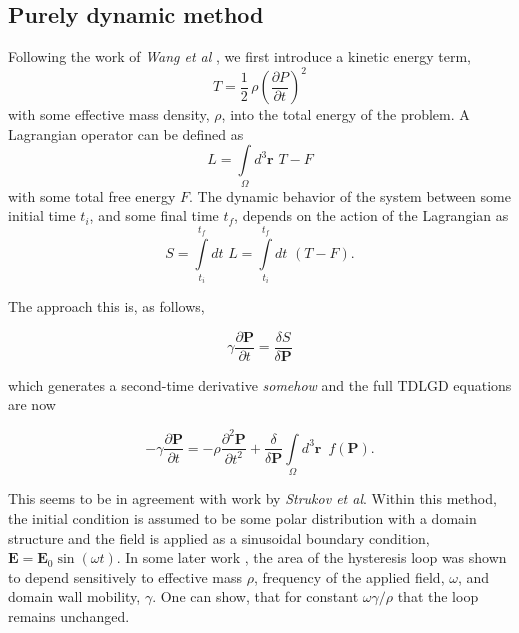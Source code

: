 \documentclass[16pt]{article} %
\begin{document}
\subsection{Purely dynamic method}
%

%
Following the work of \emph{Wang et al} \cite{Wang2003}, we first introduce a kinetic energy term,
%
$$T =  \frac{1}{2} \,\rho \left(\frac{\partial P}{\partial t} \right)^2 $$
%
with some effective mass density, $\rho$, into the total energy of the problem. A Lagrangian operator can be defined as
%
$$L = \int\limits_\Omega d^3 \textbf{r} \,\, T - F$$
%
with some total free energy $F$.
%
The dynamic behavior of the system between some initial time $t_i$, and some final time $t_f$, depends on the action of the Lagrangian as
%
$$S = \int\limits_{t_i}^{t_f} dt \,\, L  =  \int\limits_{t_i}^{t_f} dt \,\, \left(T - F \right). $$

The approach this is, as follows,

$$\gamma \frac{\partial \textbf{P}}{\partial t} =  \frac{\delta S}{\delta \textbf{P}}$$

which generates a second-time derivative \emph{somehow} and the full TDLGD equations are now

\begin{equation}\tag{50}
- \gamma \frac{\partial \textbf{P}}{\partial t} =  -\rho \frac{\partial^2 \textbf{P}}{\partial t^2} + \frac{\delta}{\delta \textbf{P}}\int\limits_\Omega d^3 \textbf{r} \,\,\,f\left(\textbf{P} \right).
\end{equation}

This seems to be in agreement with work by \emph{Strukov et al}. Within this method, the initial condition is assumed to be some polar distribution with a domain structure and the field is applied as a sinusoidal boundary condition, $\textbf{E} =  \textbf{E}_0 \sin{\left(\omega t \right)}$.  In some later work \cite{Wang2011}, the area of the hysteresis loop was shown to depend sensitively to effective mass $\rho$, frequency of the applied field, $\omega$, and domain wall mobility, $\gamma$. One can show, that for constant $\omega \gamma/\rho$ that the loop remains unchanged.




\end{document}
